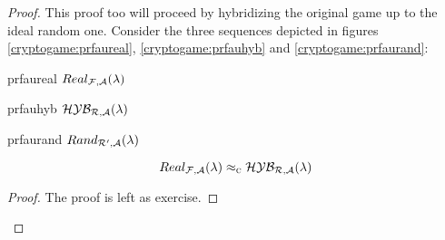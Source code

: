 \begin{proof}

    This proof too will proceed by hybridizing the original game up to the ideal random one. Consider the three sequences depicted in figures \ref{cryptogame:prfaureal}, \ref{cryptogame:prfauhyb} and \ref{cryptogame:prfaurand}:

    \begin{cryptogame}
        {prfaureal}
        {$Real_{\mathcal{F}, \mathcal{A}}(\lambda)$}
        {}


        \cseqbeginloop
        \cseqendloop
        
    \end{cryptogame}

    \begin{cryptogame}
        {prfauhyb}
        {$\mathcal{H}\mathcal{Y}\mathcal{B}_{\mathcal{R}, \mathcal{A}}(\lambda)$}
        {}


        \cseqbeginloop
        \cseqendloop
        
    \end{cryptogame}

    \begin{cryptogame}
        {prfaurand}
        {$Rand_{\mathcal{R}', \mathcal{A}}(\lambda)$}
        {}


        \cseqbeginloop
        \cseqendloop
        
    \end{cryptogame}


    \begin{lemma}
        \[
            Real_{\mathcal{F}, \mathcal{A}}(\lambda) \approx_\textsc{c} \mathcal{H}\mathcal{Y}\mathcal{B}_{\mathcal{R}, \mathcal{A}}(\lambda)
        \]
    \end{lemma}

    \begin{proof}
        The proof is left as exercise.
    \end{proof}


\end{proof}
